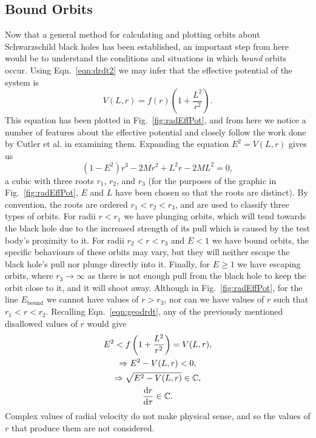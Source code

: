 
\subsection{Bound Orbits}
Now that a general method for calculating and plotting orbits about Schwarzschild black holes has been established, an important step from here would be to understand the conditions and situations in which \textit{bound} orbits occur.
Using Eqn.~\eqref{eqn:drdt2} we may infer that the effective potential of the system is
\begin{equation}\label{eqn:effPot}
    V(L,r)=f(r)\left(1+\frac{L^2}{r^2}\right).
\end{equation}
This equation has been plotted in Fig.~\eqref{fig:radEffPot}, and from here we notice a number of features about the effective potential and closely follow the work done by Cutler et al. \cite{cutlerEtAl} in examining them.
Expanding the equation $E^2=V(L,r)$ gives us
\begin{equation}\label{eqn:cubicEffPot}
    (1-E^2)r^3-2Mr^2+L^2r-2ML^2=0,
\end{equation}
a cubic with three roots $r_1$, $r_2$, and $r_3$ (for the purposes of the graphic in Fig.~\eqref{fig:radEffPot}, $E$ and $L$ have been chosen so that the roots are distinct).
By convention, the roots are ordered $r_1<r_2<r_3$, and are used to classify three types of orbits.
For radii $r<r_1$ we have plunging orbits, which will tend towards the black hole due to the increased strength of its pull which is caused by the test body's proximity to it.
For radii $r_2<r<r_3$ and $E<1$ we have bound orbits, the specific behaviours of these orbits may vary, but they will neither escape the black hole's pull nor plunge directly into it.
Finally, for $E\geq 1$ we have escaping orbits, where $r_3\rightarrow \infty$ as there is not enough pull from the black hole to keep the orbit close to it, and it will shoot away.
Although in Fig.~\eqref{fig:radEffPot}, for the line $E_\text{bound}$ we cannot have values of $r>r_3$, nor can we have values of $r$ such that $r_1<r<r_2$.
Recalling Eqn.~\eqref{eqn:geodrdt}, any of the previously mentioned disallowed values of $r$ would give
\begin{gather}
    E^2<f\left(1+\frac{L^2}{r^2}\right)=V(L,r),\\
    \Rightarrow E^2-V(L,r)<0,\\
    \Rightarrow \sqrt{E^2-V(L,r)} \in \mathbb{C},\\
    \dv{r}{\tau}\in\mathbb{C}.
\end{gather}
Complex values of radial velocity do not make physical sense, and so the values of $r$ that produce them are not considered.

